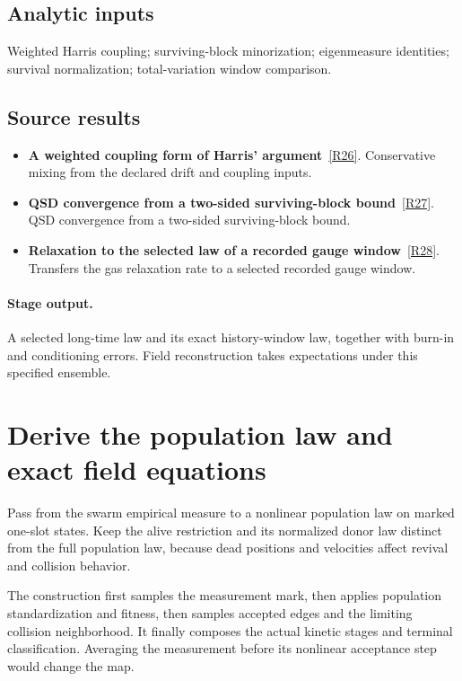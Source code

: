 \documentclass[11pt,a4paper]{article}
\begin{document}
\subsection*{Analytic inputs}
Weighted Harris coupling; surviving-block minorization; eigenmeasure identities; survival normalization; total-variation window comparison.
\subsection*{Source results}
\begin{itemize}
\item \textbf{A weighted coupling form of Harris' argument}~\hyperref[src:thm-convergence-conservative-harris]{[R26]}. Conservative mixing from the declared drift and coupling inputs.
\item \textbf{QSD convergence from a two-sided surviving-block bound}~\hyperref[src:thm-main-convergence]{[R27]}. QSD convergence from a two-sided surviving-block bound.
\item \textbf{Relaxation to the selected law of a recorded gauge window}~\hyperref[src:thm-ym-qsd-window-relaxation]{[R28]}. Transfers the gas relaxation rate to a selected recorded gauge window.
\end{itemize}
\paragraph{Stage output.} A selected long-time law and its exact history-window law, together with burn-in and conditioning errors. Field reconstruction takes expectations under this specified ensemble.

\section{Derive the population law and exact field equations}
\label{stage:5}
Pass from the swarm empirical measure to a nonlinear population law on marked one-slot states. Keep the alive restriction and its normalized donor law distinct from the full population law, because dead positions and velocities affect revival and collision behavior.

The construction first samples the measurement mark, then applies population standardization and fitness, then samples accepted edges and the limiting collision neighborhood. It finally composes the actual kinetic stages and terminal classification. Averaging the measurement before its nonlinear acceptance step would change the map.
\end{document}
